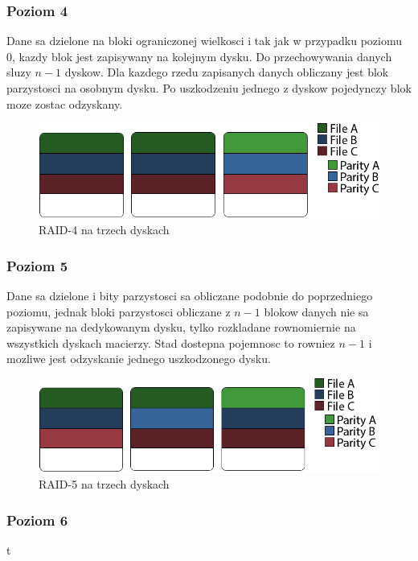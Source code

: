 \subsubsection{Poziom 4}
Dane sa dzielone na bloki ograniczonej wielkosci i tak jak w przypadku poziomu 0, kazdy blok jest zapisywany na kolejnym dysku. Do przechowywania danych sluzy $n-1$ dyskow. Dla kazdego rzedu zapisanych danych obliczany jest blok parzystosci na osobnym dysku. Po uszkodzeniu jednego z dyskow pojedynczy blok moze zostac odzyskany.
\begin{figure}[h!]
        \centering
        \includegraphics[scale=0.8]{raid-4.png}
        \caption{RAID-4 na trzech dyskach}
        \label{fig:raid4}
\end{figure}
\subsubsection{Poziom 5}
Dane sa dzielone i bity parzystosci sa obliczane podobnie do poprzedniego poziomu, jednak bloki parzystosci obliczane z $n-1$ blokow danych nie sa zapisywane na dedykowanym dysku, tylko rozkladane rownomiernie na wszystkich dyskach macierzy. Stad dostepna pojemnosc to rowniez $n-1$ i mozliwe jest odzyskanie jednego uszkodzonego dysku.
\begin{figure}[h!]
        \centering
        \includegraphics[scale=0.8]{raid-5.png}
        \caption{RAID-5 na trzech dyskach}
        \label{fig:raid5}
\end{figure}
\subsubsection{Poziom 6}
t
\newpage
